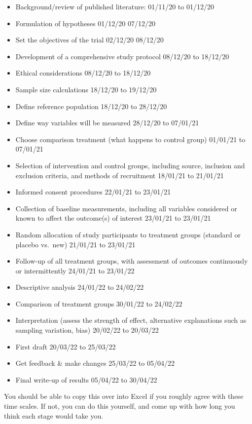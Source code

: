 \documentclass[
]{book}
\providecommand{\tightlist}{%
  \setlength{\itemsep}{0pt}\setlength{\parskip}{0pt}}
\begin{document}
\begin{itemize}
\tightlist
\item
  Background/review of published literature: 01/11/20 to 01/12/20
\item
  Formulation of hypotheses 01/12/20 07/12/20
\item
  Set the objectives of the trial 02/12/20 08/12/20
\item
  Development of a comprehensive study protocol 08/12/20 to 18/12/20
\item
  Ethical considerations 08/12/20 to 18/12/20
\item
  Sample size calculations 18/12/20 to 19/12/20
\item
  Define reference population 18/12/20 to 28/12/20
\item
  Define way variables will be measured 28/12/20 to 07/01/21
\item
  Choose comparison treatment (what happens to control group) 01/01/21 to 07/01/21
\item
  Selection of intervention and control groups, including source, inclusion and exclusion criteria, and methods of recruitment 18/01/21 to 21/01/21
\item
  Informed consent procedures 22/01/21 to 23/01/21
\item
  Collection of baseline measurements, including all variables considered or known to affect the outcome(s) of interest 23/01/21 to 23/01/21
\item
  Random allocation of study participants to treatment groups (standard or placebo vs.~new) 21/01/21 to 23/01/21
\item
  Follow-up of all treatment groups, with assessment of outcomes continuously or intermittently 24/01/21 to 23/01/22
\item
  Descriptive analysis 24/01/22 to 24/02/22
\item
  Comparison of treatment groups 30/01/22 to 24/02/22
\item
  Interpretation (assess the strength of effect, alternative explanations such as sampling variation, bias) 20/02/22 to 20/03/22
\item
  First draft 20/03/22 to 25/03/22
\item
  Get feedback \& make changes 25/03/22 to 05/04/22
\item
  Final write-up of results 05/04/22 to 30/04/22
\end{itemize}

You should be able to copy this over into Excel if you roughly agree with these time scales. If not, you can do this yourself, and come up with how long you think each stage would take you.
\end{document}
